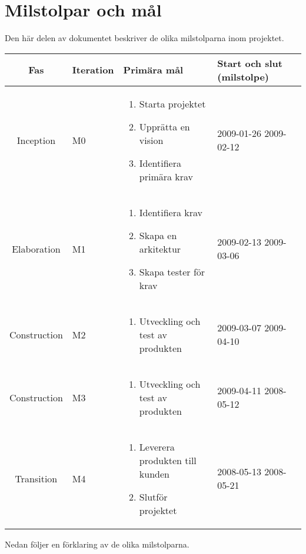 \newpage

\section{Milstolpar och mål}
Den här delen av dokumentet beskriver de olika milstolparna inom projektet.

\begin{center}
	\begin{tabular}{| c | m{1.5cm} | m{5cm} | m{2.5cm} | m{2cm} |}
		\hline
		\textbf{Fas} & \textbf{Iteration} & \textbf{Primära mål} & \textbf{Start och slut (milstolpe)} \\
		\hline
		Inception & M0 & \begin{enumerate} \item Starta projektet \item Upprätta en vision \item Identifiera primära krav \end{enumerate} & 2009-01-26 2009-02-12 \\
		\hline
		Elaboration & M1 & \begin{enumerate} \item Identifiera krav \item Skapa en arkitektur \item Skapa tester för krav \end{enumerate} & 2009-02-13 2009-03-06 \\
		\hline
		Construction & M2 & \begin{enumerate} \item Utveckling och test av produkten \end{enumerate} & 2009-03-07 2009-04-10 \\
		\hline
		Construction & M3 & \begin{enumerate} \item Utveckling och test av produkten \end{enumerate} & 2009-04-11 2008-05-12 \\
		\hline
		Transition & M4 & \begin{enumerate} \item Leverera produkten till kunden \item Slutför projektet \end{enumerate} & 2008-05-13 2008-05-21 \\
		\hline
	\end{tabular}
\end{center}

\emph{ }\linebreak
Nedan följer en förklaring av de olika milstolparna.

